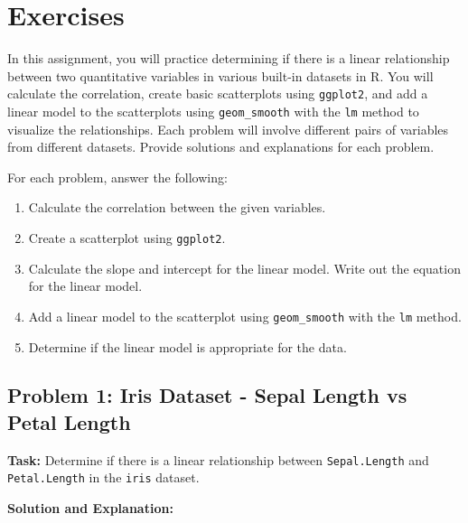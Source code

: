 \documentclass[
  letterpaper,
  DIV=11,
  numbers=noendperiod]{scrreprt}
\newenvironment{Shaded}{\begin{snugshade}}{\end{snugshade}}
\newcommand{\CommentTok}[1]{\textcolor[rgb]{0.37,0.37,0.37}{#1}}
\newcommand{\FunctionTok}[1]{\textcolor[rgb]{0.28,0.35,0.67}{#1}}
\newcommand{\NormalTok}[1]{\textcolor[rgb]{0.00,0.23,0.31}{#1}}
\newcommand{\OtherTok}[1]{\textcolor[rgb]{0.00,0.23,0.31}{#1}}
\newcommand{\SpecialCharTok}[1]{\textcolor[rgb]{0.37,0.37,0.37}{#1}}
\providecommand{\tightlist}{%
  \setlength{\itemsep}{0pt}\setlength{\parskip}{0pt}}\usepackage{longtable,booktabs,array}
\begin{document}
\section*{Exercises}\label{exercises-14}


In this assignment, you will practice determining if there is a linear
relationship between two quantitative variables in various built-in
datasets in R. You will calculate the correlation, create basic
scatterplots using \texttt{ggplot2}, and add a linear model to the
scatterplots using \texttt{geom\_smooth} with the \texttt{lm} method to
visualize the relationships. Each problem will involve different pairs
of variables from different datasets. Provide solutions and explanations
for each problem.

For each problem, answer the following:

\begin{enumerate}
\def\labelenumi{\arabic{enumi}.}
\tightlist
\item
  Calculate the correlation between the given variables.
\item
  Create a scatterplot using \texttt{ggplot2}.
\item
  Calculate the slope and intercept for the linear model. Write out the
  equation for the linear model.
\item
  Add a linear model to the scatterplot using \texttt{geom\_smooth} with
  the \texttt{lm} method.
\item
  Determine if the linear model is appropriate for the data.
\end{enumerate}

\subsection*{Problem 1: Iris Dataset - Sepal Length vs Petal
Length}\label{problem-1-iris-dataset---sepal-length-vs-petal-length-1}

\textbf{Task:} Determine if there is a linear relationship between
\texttt{Sepal.Length} and \texttt{Petal.Length} in the \texttt{iris}
dataset.

\textbf{Solution and Explanation:}

\begin{Shaded}
\end{Shaded}
\end{document}
